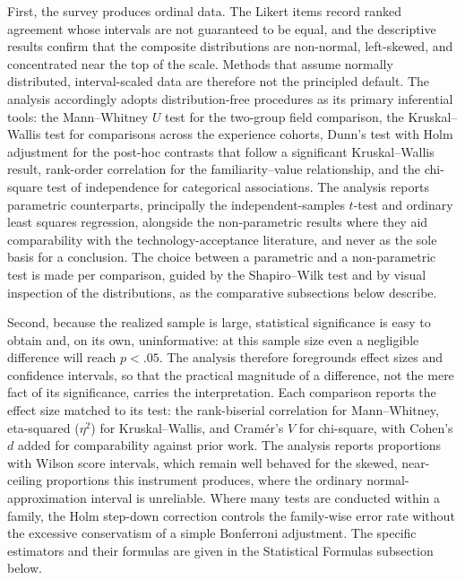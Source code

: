 First, the survey produces ordinal data. The Likert items record ranked agreement whose intervals are not guaranteed to be equal, and the descriptive results confirm that the composite distributions are non-normal, left-skewed, and concentrated near the top of the scale. Methods that assume normally distributed, interval-scaled data are therefore not the principled default. The analysis accordingly adopts distribution-free procedures as its primary inferential tools: the Mann--Whitney $U$ test for the two-group field comparison, the Kruskal--Wallis test for comparisons across the experience cohorts, Dunn's test with Holm adjustment for the post-hoc contrasts that follow a significant Kruskal--Wallis result, rank-order correlation for the familiarity--value relationship, and the chi-square test of independence for categorical associations. The analysis reports parametric counterparts, principally the independent-samples $t$-test and ordinary least squares regression, alongside the non-parametric results where they aid comparability with the technology-acceptance literature, and never as the sole basis for a conclusion. The choice between a parametric and a non-parametric test is made per comparison, guided by the Shapiro--Wilk test and by visual inspection of the distributions, as the comparative subsections below describe.

Second, because the realized sample is large, statistical significance is easy to obtain and, on its own, uninformative: at this sample size even a negligible difference will reach $p<.05$. The analysis therefore foregrounds effect sizes and confidence intervals, so that the practical magnitude of a difference, not the mere fact of its significance, carries the interpretation. Each comparison reports the effect size matched to its test: the rank-biserial correlation for Mann--Whitney, eta-squared ($\eta^2$) for Kruskal--Wallis, and Cram\'er's $V$ for chi-square, with Cohen's $d$ added for comparability against prior work. The analysis reports proportions with Wilson score intervals, which remain well behaved for the skewed, near-ceiling proportions this instrument produces, where the ordinary normal-approximation interval is unreliable. Where many tests are conducted within a family, the Holm step-down correction controls the family-wise error rate without the excessive conservatism of a simple Bonferroni adjustment. The specific estimators and their formulas are given in the Statistical Formulas subsection below.

